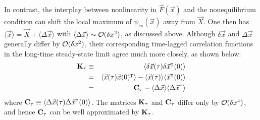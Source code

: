 In contrast, the interplay between nonlinearity in ${\vec{ F}}({\vec x})$ and the nonequilibrium condition can shift the local maximum of $\psi_{ss}({\vec x})$ away from ${\vec X}$. One then has $\langle{\vec x}\rangle={\vec X} + \langle \Delta \vec x\rangle$ with $\langle \Delta \vec x\rangle\sim {\cal O}(\delta x^2)$, as discussed above. Although $\delta{\vec x}$ and $\Delta{\vec x}$ generally differ by ${\cal O}(\delta x^2)$, their corresponding time-lagged correlation functions in the long-time steady-state limit agree much more closely, as shown below:
\begin{eqnarray}
    {\bf K}_\tau&\equiv& \langle \delta{\vec x}(\tau)\delta{\vec x}^\intercal(0)\rangle \\
 &=&  \langle{\vec x}(\tau){\vec x}(0)^\intercal\rangle -  \langle{\vec x}(\tau)\rangle  \langle{\vec x}^\intercal(0)\rangle \label{ktau2} \\
  &=&  {\bf C}_\tau -  \langle\Delta{\vec x}\rangle  \langle\Delta{\vec x}^\intercal\rangle\label{ktau3}
\end{eqnarray}
where $ {\bf C}_\tau\equiv \langle\Delta{\vec x}(\tau) \Delta{\vec x}^\intercal(0)\rangle$. The matrices ${\bf K}_\tau$ and ${\bf C}_\tau$ differ only by ${\cal O}(\delta x^4)$, and hence ${\bf C}_\tau$ can be well approximated by ${\bf K}_\tau$.

